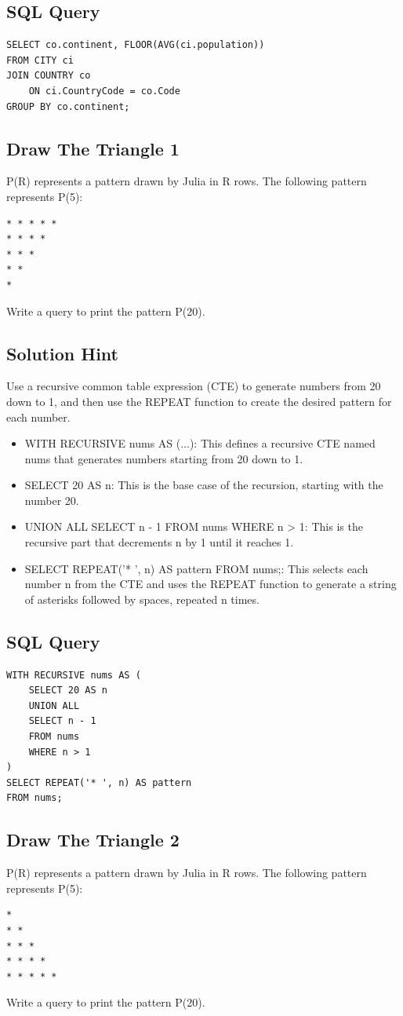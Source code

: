 \documentclass[12pt,a4paper]{article}
\begin{document}
\subsection*{SQL Query}
\begin{lstlisting}[style=sqlstyle]
SELECT co.continent, FLOOR(AVG(ci.population))
FROM CITY ci 
JOIN COUNTRY co 
    ON ci.CountryCode = co.Code 
GROUP BY co.continent;
\end{lstlisting}
\subsection{Draw The Triangle 1}
P(R) represents a pattern drawn by Julia in R rows. The following pattern represents P(5):
\begin{verbatim}
* * * * * 
* * * * 
* * * 
* * 
*
\end{verbatim}
Write a query to print the pattern P(20).
\subsection*{Solution Hint} 
Use a recursive common table expression (CTE) to generate numbers from 20 down to 1, and then use the REPEAT function to create the desired pattern for each number.
\begin{itemize}
    \item WITH RECURSIVE nums AS (...): This defines a recursive CTE named nums that generates numbers starting from 20 down to 1.
    \item SELECT 20 AS n: This is the base case of the recursion, starting with the number 20.
    \item UNION ALL SELECT n - 1 FROM nums WHERE n > 1: This is the recursive part that decrements n by 1 until it reaches 1.
    \item SELECT REPEAT('* ', n) AS pattern FROM nums;: This selects each number n from the CTE and uses the REPEAT function to generate a string of asterisks followed by spaces, repeated n times.
\end{itemize}
\subsection*{SQL Query}
\begin{lstlisting}[style=sqlstyle]
WITH RECURSIVE nums AS (
    SELECT 20 AS n
    UNION ALL
    SELECT n - 1
    FROM nums
    WHERE n > 1
)
SELECT REPEAT('* ', n) AS pattern
FROM nums;
\end{lstlisting}
\subsection{Draw The Triangle 2}
P(R) represents a pattern drawn by Julia in R rows. The following pattern represents P(5):
\begin{verbatim}
* 
* * 
* * * 
* * * * 
* * * * *
\end{verbatim}
Write a query to print the pattern P(20).
\end{document}
